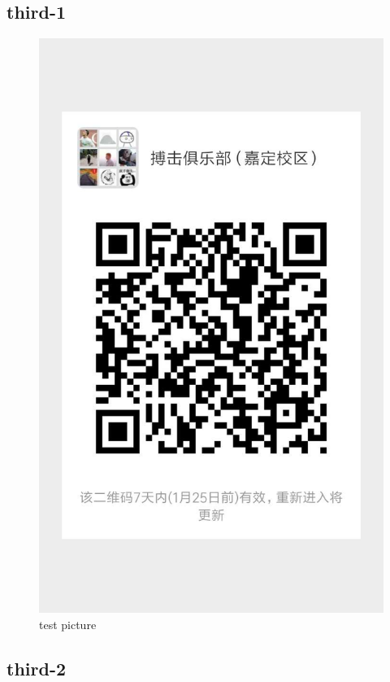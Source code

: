 \documentclass[a4paper, UTF8]{article}
\begin{document}
\subsection{third-1}
\begin{figure}[htbp]
    \caption{test picture}
    \includegraphics[scale=0.3]{01.jpg}
\end{figure}
\subsection{third-2}
\newpage
\end{document}

